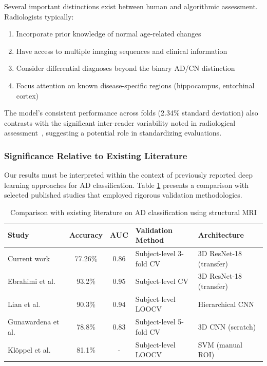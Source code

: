 \documentclass[12pt, a4paper]{article}
\begin{document}
Several important distinctions exist between human and algorithmic assessment. Radiologists typically:
\begin{enumerate}
    \item Incorporate prior knowledge of normal age-related changes
    \item Have access to multiple imaging sequences and clinical information
    \item Consider differential diagnoses beyond the binary AD/CN distinction
    \item Focus attention on known disease-specific regions (hippocampus, entorhinal cortex)
\end{enumerate}

The model's consistent performance across folds (2.34\% standard deviation) also contrasts with the significant inter-reader variability noted in radiological assessment~\cite{kloppel2008accuracy}, suggesting a potential role in standardizing evaluations.

\subsubsection{Significance Relative to Existing Literature}

Our results must be interpreted within the context of previously reported deep learning approaches for AD classification. Table \ref{tab:literature_comparison} presents a comparison with selected published studies that employed rigorous validation methodologies.

\begin{table}[htbp]
\centering
\begin{tabular}{|l|c|c|p{2.5cm}|p{2.5cm}|}
\hline
\textbf{Study} & \textbf{Accuracy} & \textbf{AUC} & \textbf{Validation Method} & \textbf{Architecture} \\
\hline
Current work & 77.26\% & 0.86 & Subject-level 3-fold CV & 3D ResNet-18 (transfer) \\
\hline
Ebrahimi et al.~\cite{ebrahimi2019transfer} & 93.2\% & 0.95 & Subject-level CV & 3D ResNet-18 (transfer) \\
\hline
Lian et al.~\cite{lian2018hierarchical} & 90.3\% & 0.94 & Subject-level LOOCV & Hierarchical CNN \\
\hline
Gunawardena et al.~\cite{gunawardena2017applying} & 78.8\% & 0.83 & Subject-level 5-fold CV & 3D CNN (scratch) \\
\hline
Klöppel et al.~\cite{kloppel2008accuracy} & 81.1\% & - & Subject-level LOOCV & SVM (manual ROI) \\
\hline
\end{tabular}
\caption{Comparison with existing literature on AD classification using structural MRI}
\label{tab:literature_comparison}
\end{table}
\end{document}
